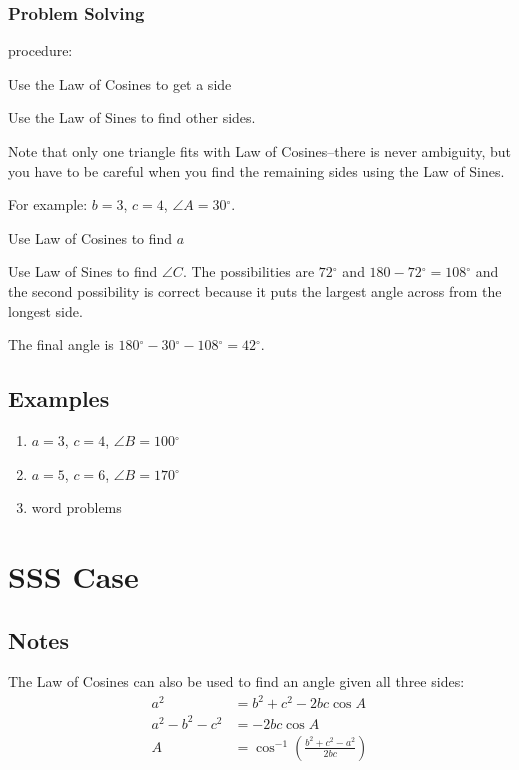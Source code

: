 \documentclass{exam}
\newcommand{\dg}{\ensuremath{^\circ}}
\begin{document}
  \subsubsection{Problem Solving}

  procedure:
  \begin{itemize*}
    \item Use the Law of Cosines to get a side
    \item Use the Law of Sines to find other sides.    
  \end{itemize*}

  Note that only one triangle fits with Law of Cosines--there is never ambiguity, but you have to be careful when you
  find the remaining sides using the Law of Sines.

  For example: $b = 3$, $c = 4$, $\angle A = 30 \dg$.  
  \begin{itemize*}
    \item Use Law of Cosines to find $a$

    \item Use Law of Sines to find $\angle C$.  The possibilities are $72 \dg$ and $180 - 72 \dg = 108 \dg$ and the
      second possibility is correct because it puts the largest angle across from the longest side.

    \item The final angle is $180 \dg - 30 \dg - 108 \dg = 42 \dg$.
  \end{itemize*}

  \subsection{Examples}
  \begin{enumerate}
    \item $a = 3$, $c = 4$, $\angle B = 100 \dg$

    \item $a = 5$, $c = 6$, $\angle B = 170 \dg$

    \item word problems

  \end{enumerate}

  \section{SSS Case}
  \subsection{Notes}
  The Law of Cosines can also be used to find an angle given all three sides:
  \begin{align*}
    a^2             & = b^2 + c^2 - 2bc \cos A \\
    a^2 - b^2 - c^2 & = - 2bc \cos A \\
    A               & = \cos^{-1} \left( \frac{b^2 + c^2 - a^2}{2bc} \right) \\
  \end{align*}
\end{document}

